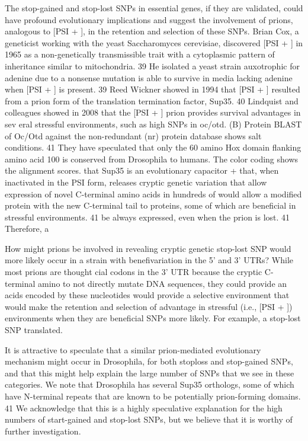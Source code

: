 The stop-gained and stop-lost SNPs in essential genes, if they are validated, could have profound evolutionary implications and suggest the involvement of prions, analogous to [PSI + ], in the retention and selection of these SNPs.  Brian Cox, a geneticist working with the yeast Saccharomyces cerevisiae, discovered [PSI + ] in 1965 as a non-genetically transmissible trait with a cytoplasmic pattern of inheritance similar to mitochondria. 39 He isolated a yeast strain auxotrophic for adenine due to a nonsense mutation is able to survive in media lacking adenine when [PSI + ] is present. 39 Reed Wickner showed in 1994 that [PSI + ] resulted from a prion form of the translation termination factor, Sup35. 40 Lindquist and colleagues showed in 2008 that the [PSI + ] prion provides survival advantages in sev eral stressful environments, such as high SNPs in oc/otd. (B) Protein BLAST of Oc/Otd against the non-redundant (nr) protein database shows salt conditions. 41 They have speculated that only the 60 amino Hox domain flanking amino acid 100 is conserved from Drosophila to humans. The color coding shows the alignment scores.  that Sup35 is an evolutionary capacitor + that, when inactivated in the PSI form, releases cryptic genetic variation that allow expression of novel C-terminal amino acids in hundreds of would allow a modified protein with the new C-terminal tail to proteins, some of which are beneficial in stressful environments. 41 be always expressed, even when the prion is lost. 41 Therefore, a

How might prions be involved in revealing cryptic genetic stop-lost SNP would more likely occur in a strain with benefivariation in the 5' and 3' UTRs? While most prions are thought cial codons in the 3' UTR because the cryptic C-terminal amino to not directly mutate DNA sequences, they could provide an acids encoded by these nucleotides would provide a selective environment that would make the retention and selection of advantage in stressful (i.e., [PSI + ]) environments when they are beneficial SNPs more likely. For example, a stop-lost SNP translated.

It is attractive to speculate that a similar prion-mediated evolutionary mechanism might occur in Drosophila, for both stoploss and stop-gained SNPs, and that this might help explain the large number of SNPs that we see in these categories. We note that Drosophila has several Sup35 orthologs, some of which have N-terminal repeats that are known to be potentially prion-forming domains. 41 We acknowledge that this is a highly speculative explanation for the high numbers of start-gained and stop-lost SNPs, but we believe that it is worthy of further investigation.

